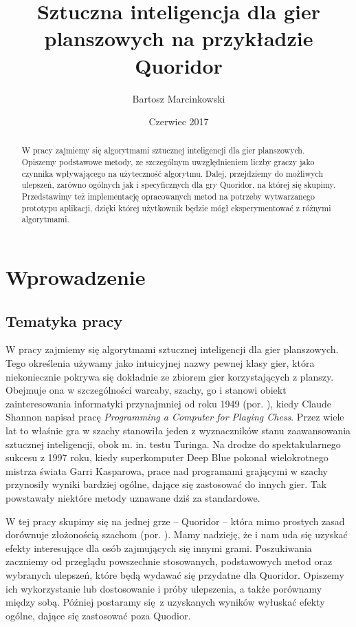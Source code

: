 \documentclass{pracamgr}
\author{Bartosz Marcinkowski}
\title{Sztuczna inteligencja dla gier planszowych na przykładzie Quoridor}
\date{Czerwiec 2017}
\begin{document}
\maketitle

\begin{abstract}
W pracy zajmiemy się algorytmami sztucznej inteligencji dla gier planszowych.
Opiszemy podstawowe metody, ze szczególnym uwzględnieniem liczby graczy jako czynnika wpływającego na użyteczność algorytmu.
Dalej, przejdziemy do możliwych ulepszeń, zarówno ogólnych jak i specyficznych dla gry Quoridor, na której się skupimy.
Przedstawimy też implementację opracowanych metod na potrzeby wytwarzanego prototypu aplikacji, dzięki której użytkownik będzie mógł eksperymentować z różnymi algorytmami.
\end{abstract}

\tableofcontents


\chapter{Wprowadzenie}

\section{Tematyka pracy}

W pracy zajmiemy się algorytmami sztucznej inteligencji dla gier planszowych.
Tego określenia używamy jako intuicyjnej nazwy pewnej klasy gier, która niekoniecznie pokrywa się dokładnie ze zbiorem gier korzystających z planszy.
Obejmuje ona w szczególności warcaby, szachy, go i stanowi obiekt zainteresowania informatyki przynajmniej od roku 1949 (por. \cite{anderson}), kiedy Claude Shannon napisał pracę \textit{Programming a Computer for Playing Chess}.
Przez wiele lat to właśnie gra w szachy stanowiła jeden z wyznaczników stanu zaawansowania sztucznej inteligencji, obok m. in. testu Turinga.
Na drodze do spektakularnego sukcesu z 1997 roku, kiedy superkomputer Deep Blue pokonał wielokrotnego mistrza świata Garri Kasparowa, prace nad programami grającymi w szachy przynosiły wyniki bardziej ogólne, dające się zastosować do innych gier.
Tak powstawały niektóre metody uznawane dziś za standardowe.

W tej pracy skupimy się na jednej grze -- Quoridor -- która mimo prostych zasad dorównuje złożonością szachom (por. \cite{mertens}).
Mamy nadzieję, że i nam uda się uzyskać efekty interesujące dla osób zajmujących się innymi grami.
Poszukiwania zaczniemy od przeglądu powszechnie stosowanych, podstawowych metod oraz wybranych ulepszeń, które będą wydawać się przydatne dla Quoridor.
Opiszemy ich wykorzystanie lub dostosowanie i próby ulepszenia, a także porównamy między sobą.
Później postaramy się z uzyskanych wyników wyłuskać efekty ogólne, dające się zastosować poza Quodior.
\end{document}
